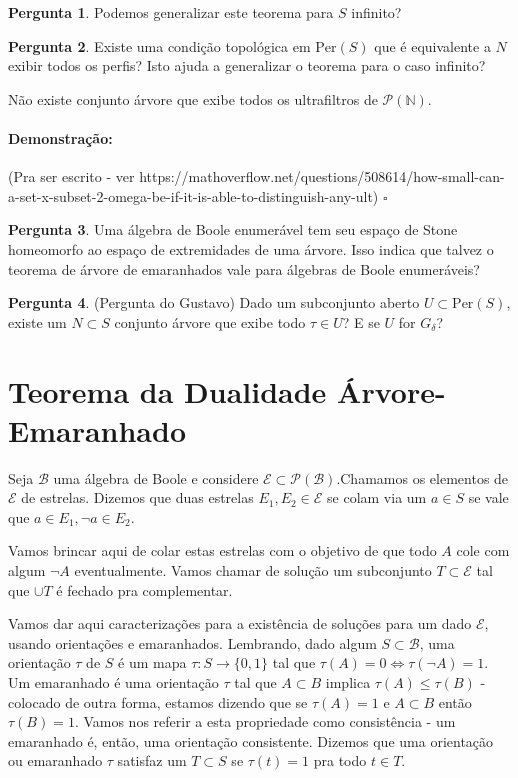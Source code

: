 \documentclass[11pt]{article}
\newcommand{\pulinho}{\vspace{.5cm}}
\theoremstyle{definition}
\theoremstyle{definition}
\theoremstyle{definition}
\theoremstyle{definition}
\newtheorem*{prop*}{Proposição}
\newenvironment{proposicao*}{
\definecolor{shadecolor}{HTML}{FFDBDF}
\begin{shaded}
\begin{prop*}
}
{
\end{prop*}
\end{shaded}
}
\theoremstyle{definition}
\theoremstyle{definition}
\theoremstyle{definition}
\theoremstyle{definition}
\theoremstyle{definition}
\theoremstyle{definition}
\theoremstyle{definition}
\theoremstyle{definition}
\newenvironment{prova}{\paragraph{Demonstração:}}{\hfill$\square$ 
\pulinho
}
\theoremstyle{definition}
\theoremstyle{definition}
\newtheorem{preguta}{Pergunta}
\newenvironment{pergunta}{
\definecolor{shadecolor}{HTML}{FFF8F0}
\begin{shaded}
\begin{preguta}
}
{
\end{preguta}
\end{shaded}
}
\begin{document}
\begin{pergunta}
  Podemos generalizar este teorema para $S$ infinito?
\end{pergunta}

\begin{pergunta}
Existe uma condição topológica em $\text{Per}(S)$ que é equivalente a $N$ exibir todos os perfis? Isto ajuda a generalizar o teorema para o caso infinito?
\end{pergunta}


\begin{proposicao*}
  Não existe conjunto árvore que exibe todos os ultrafiltros de $\mathcal{P}(\mathbb{N})$.
\end{proposicao*}
\begin{prova}
 (Pra ser escrito - ver https://mathoverflow.net/questions/508614/how-small-can-a-set-x-subset-2-omega-be-if-it-is-able-to-distinguish-any-ult)
\end{prova}
\begin{pergunta}
  Uma álgebra de Boole enumerável tem seu espaço de Stone homeomorfo ao espaço de extremidades de uma árvore. Isso indica que talvez o teorema de árvore de emaranhados vale para álgebras de Boole enumeráveis?
\end{pergunta}

\begin{pergunta}
  (Pergunta do Gustavo) Dado um subconjunto aberto $U \subset \text{Per}(S)$, existe um $N \subset S$ conjunto árvore que exibe todo $\tau \in U$? E se $U$ for $G_{\delta}$?
\end{pergunta}

\section{Teorema da Dualidade Árvore-Emaranhado}

Seja $\mathcal{B}$ uma álgebra de Boole e considere $\mathcal{E} \subset \mathcal{P}(\mathcal{B})$.Chamamos os elementos de $\mathcal{E}$ de estrelas. Dizemos que duas estrelas $E_1,E_2 \in \mathcal{E}$ se colam via um $a \in S$ se vale que $a \in E_1, \lnot a \in E_2$.

Vamos brincar aqui de colar estas estrelas com o objetivo de que todo $A$ cole com algum $\lnot A$ eventualmente. Vamos chamar de solução um subconjunto $T \subset \mathcal{E}$ tal que $\cup T$ é fechado pra complementar.

Vamos dar aqui caracterizações para a existência de soluções para um dado $\mathcal{E}$, usando orientações e emaranhados. Lembrando, dado algum $S \subset \mathcal{B}$, uma orientação $\tau$ de $S$ é um mapa $\tau: S \rightarrow \{0,1\}$ tal que $\tau(A) = 0 \iff \tau(\lnot A) = 1$. Um emaranhado é uma orientação $\tau$ tal que $A\subset B$ implica $\tau(A) \leq \tau(B)$ - colocado de outra forma, estamos dizendo que se $\tau(A) = 1$ e $A \subset B$ então $\tau(B) = 1$. Vamos nos referir a esta propriedade como consistência - um emaranhado é, então, uma orientação consistente. Dizemos que uma orientação ou emaranhado $\tau$ satisfaz um $T \subset S$ se $\tau(t) = 1$ pra todo $t \in T$.
\end{document}
